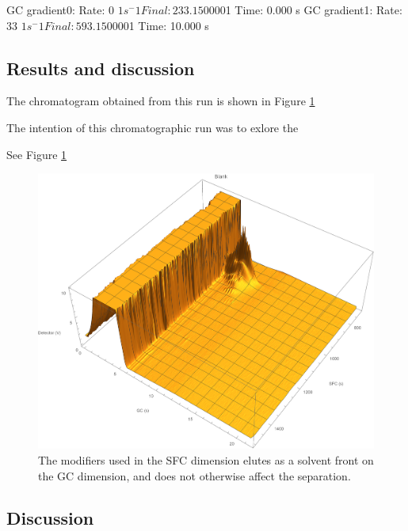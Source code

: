 GC gradient0:
Rate: 	0 $1 s^-1
Final:	233.150000 $1
Time:	0.000 s
GC gradient1:
Rate: 	33 $1 s^-1
Final:	593.150000 $1
Time:	10.000 s


\subsection{Results and discussion}

The chromatogram obtained from this run is shown in Figure \ref{fig:Modifier}

The intention of this chromatographic run was to exlore the 

See Figure \ref{fig:Modifier}

\begin{figure}
	\centering
	\includegraphics[width=\textwidth]{Figures/Modifier.pdf}
	\decoRule	
	
	\caption[Modifiers in SFC]{The modifiers used in the SFC dimension elutes as a
solvent front on the GC dimension, and does not otherwise affect the separation.}
	
	\label{fig:Modifier} 
\end{figure}

\subsection{Discussion}


